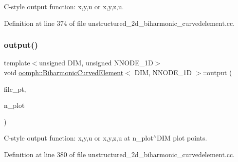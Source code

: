 C-\/style output function\+: x,y,u or x,y,z,u. 



Definition at line 374 of file unstructured\+\_\+2d\+\_\+biharmonic\+\_\+curvedelement.\+cc.

\mbox{\label{classoomph_1_1BiharmonicCurvedElement_a7a5dfc6d78fcd52385395cca7a125772}} 
\subsubsection{\texorpdfstring{output()}{output()}\hspace{0.1cm}{\footnotesize\ttfamily [4/4]}}
{\footnotesize\ttfamily template$<$unsigned D\+IM, unsigned N\+N\+O\+D\+E\+\_\+1D$>$ \\
void \hyperlink{classoomph_1_1BiharmonicCurvedElement}{oomph\+::\+Biharmonic\+Curved\+Element}$<$ D\+IM, N\+N\+O\+D\+E\+\_\+1D $>$\+::output (\begin{DoxyParamCaption}\item[{F\+I\+LE $\ast$}]{file\+\_\+pt,  }\item[{const unsigned \&}]{n\+\_\+plot }\end{DoxyParamCaption})\hspace{0.3cm}{\ttfamily [inline]}}



C-\/style output function\+: x,y,u or x,y,z,u at n\+\_\+plot$^\wedge$\+D\+IM plot points. 



Definition at line 380 of file unstructured\+\_\+2d\+\_\+biharmonic\+\_\+curvedelement.\+cc.

\mbox{\label{classoomph_1_1BiharmonicCurvedElement_a19906845c3b1678b6d193b46038042c6}} 
